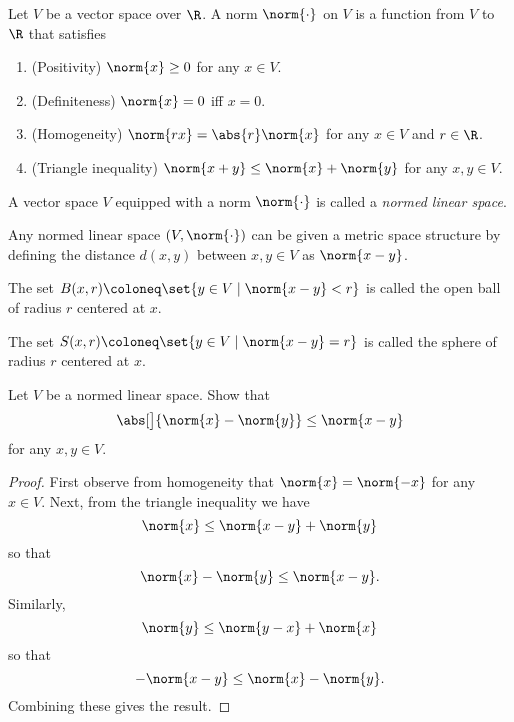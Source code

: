 \begin{definition}[norm] \label{def:norm}
    Let $V$ be a vector space over $\R$.
    A norm $\norm{\cdot}$ on $V$ is a function from $V$ to $\R$ that
    satisfies
    \begin{enumerate}[label=\small(N\arabic*)]
        \item (Positivity) $\norm{x} \ge 0$ for any $x \in V$.
            \label{def:norm:pos}
        \item (Definiteness) $\norm{x} = 0$ iff $x = 0$.
            \label{def:norm:def}
        \item (Homogeneity) $\norm{r x} = \abs{r} \norm{x}$
            for any $x \in V$ and $r \in \R$.
            \label{def:norm:hom}
        \item (Triangle inequality) $\norm{x + y} \le \norm{x} + \norm{y}$
            for any $x, y \in V$.
            \label{def:norm:tri}
    \end{enumerate}
\end{definition}

\begin{definition} \label{def:nls}
    A vector space $V$ equipped with a norm $\norm{\cdot}$ is called
    a \emph{normed linear space}.
\end{definition}

\begin{remark}
    Any normed linear space $(V, \norm{\cdot})$ can be given a metric
    space structure by defining the distance $d(x, y)$ between $x, y \in V$
    as $\norm{x - y}$.

    The set $B(x, r) \coloneq \set{y \in V \mid \norm{x - y} < r}$ is called
    the open ball of radius $r$ centered at $x$.

    The set $S(x, r) \coloneq \set{y \in V \mid \norm{x - y} = r}$ is called
    the sphere of radius $r$ centered at $x$.
\end{remark}

\begin{exercise} \label{thm:rti}
    Let $V$ be a normed linear space.
    Show that \begin{equation}
        \abs[\big]{\norm{x} - \norm{y}} \le \norm{x - y}
            \label{eq:rti}
    \end{equation} for any $x, y \in V$.
\end{exercise}
\begin{proof}
    First observe from homogeneity  that
    $\norm{x} = \norm{-x}$ for any $x \in V$.
    Next, from the triangle inequality  we have \[
        \norm{x} \le \norm{x - y} + \norm{y}
    \] so that \[
        \norm{x} - \norm{y} \le \norm{x - y}.
    \] Similarly, \[
        \norm{y} \le \norm{y - x} + \norm{x}
    \] so that \[
        -\norm{x - y} \le \norm{x} - \norm{y}.
    \] Combining these gives the result.
\end{proof}

